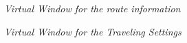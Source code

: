 \begin{figure}
\begin{center}
  \caption{\emph{Virtual Window for the route information}} \label{pic:vwRoute}
\end{center}    
\end{figure}


\begin{figure}
\begin{center}
  \caption{\emph{Virtual Window for the Traveling Settings}} \label{pic:vwSettings}
\end{center}    
\end{figure}

